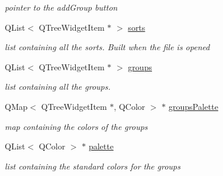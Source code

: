 \begin{DoxyCompactItemize}
\begin{DoxyCompactList}\small\item\em pointer to the add\+Group button \end{DoxyCompactList}\item 
\hypertarget{classTreeArea_a5a049742466ca1b4d0157f866f478e18}{Q\+List$<$ Q\+Tree\+Widget\+Item $\ast$ $>$ \hyperlink{classTreeArea_a5a049742466ca1b4d0157f866f478e18}{sorts}}\label{classTreeArea_a5a049742466ca1b4d0157f866f478e18}

\begin{DoxyCompactList}\small\item\em list containing all the sorts. Built when the file is opened \end{DoxyCompactList}\item 
\hypertarget{classTreeArea_a49fbc4c7f782976aa082896909c6a351}{Q\+List$<$ Q\+Tree\+Widget\+Item $\ast$ $>$ \hyperlink{classTreeArea_a49fbc4c7f782976aa082896909c6a351}{groups}}\label{classTreeArea_a49fbc4c7f782976aa082896909c6a351}

\begin{DoxyCompactList}\small\item\em list containing all the groups. \end{DoxyCompactList}\item 
\hypertarget{classTreeArea_a965d3a0fa45f6e31a50db967598f0f90}{Q\+Map$<$ Q\+Tree\+Widget\+Item $\ast$, Q\+Color $>$ $\ast$ \hyperlink{classTreeArea_a965d3a0fa45f6e31a50db967598f0f90}{groups\+Palette}}\label{classTreeArea_a965d3a0fa45f6e31a50db967598f0f90}

\begin{DoxyCompactList}\small\item\em map containing the colors of the groups \end{DoxyCompactList}\item 
\hypertarget{classTreeArea_a7e464d23da2120350b488e1828c13071}{Q\+List$<$ Q\+Color $>$ $\ast$ \hyperlink{classTreeArea_a7e464d23da2120350b488e1828c13071}{palette}}\label{classTreeArea_a7e464d23da2120350b488e1828c13071}

\begin{DoxyCompactList}\small\item\em list containing the standard colors for the groups \end{DoxyCompactList}\end{DoxyCompactItemize}
